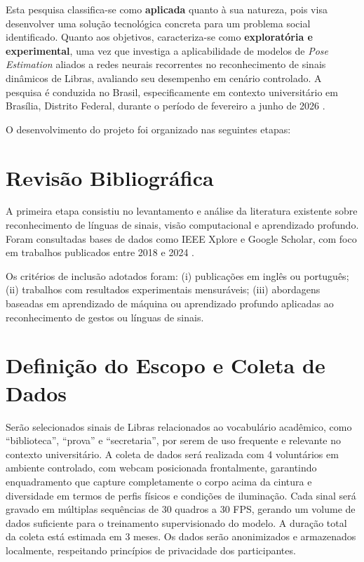 
Esta pesquisa classifica-se como \textbf{aplicada} quanto à sua natureza, pois visa desenvolver uma solução tecnológica concreta para um problema social identificado. Quanto aos objetivos, caracteriza-se como \textbf{exploratória e experimental}, uma vez que investiga a aplicabilidade de modelos de \textit{Pose Estimation} aliados a redes neurais recorrentes no reconhecimento de sinais dinâmicos de Libras, avaliando seu desempenho em cenário controlado. A pesquisa é conduzida no Brasil, especificamente em contexto universitário em Brasília, Distrito Federal, durante o período de fevereiro a junho de 2026 \cite{attili:24, jain:24}.

O desenvolvimento do projeto foi organizado nas seguintes etapas:

\section{Revisão Bibliográfica}

A primeira etapa consistiu no levantamento e análise da literatura existente sobre reconhecimento de línguas de sinais, visão computacional e aprendizado profundo. Foram consultadas bases de dados como IEEE Xplore e Google Scholar, com foco em trabalhos publicados entre 2018 e 2024 \cite{li:22, abdulhussein:20, dockens:18, wang:24}.

Os critérios de inclusão adotados foram: (i) publicações em inglês ou português; (ii) trabalhos com resultados experimentais mensuráveis; (iii) abordagens baseadas em aprendizado de máquina ou aprendizado profundo aplicadas ao reconhecimento de gestos ou línguas de sinais.

\section{Definição do Escopo e Coleta de Dados}

Serão selecionados sinais de Libras relacionados ao vocabulário acadêmico, como ``biblioteca'', ``prova'' e ``secretaria'', por serem de uso frequente e relevante no contexto universitário. A coleta de dados será realizada com 4 voluntários em ambiente controlado, com webcam posicionada frontalmente, garantindo enquadramento que capture completamente o corpo acima da cintura e diversidade em termos de perfis físicos e condições de iluminação. Cada sinal será gravado em múltiplas sequências de 30 quadros a 30 FPS, gerando um volume de dados suficiente para o treinamento supervisionado do modelo. A duração total da coleta está estimada em 3 meses. Os dados serão anonimizados e armazenados localmente, respeitando princípios de privacidade dos participantes.

